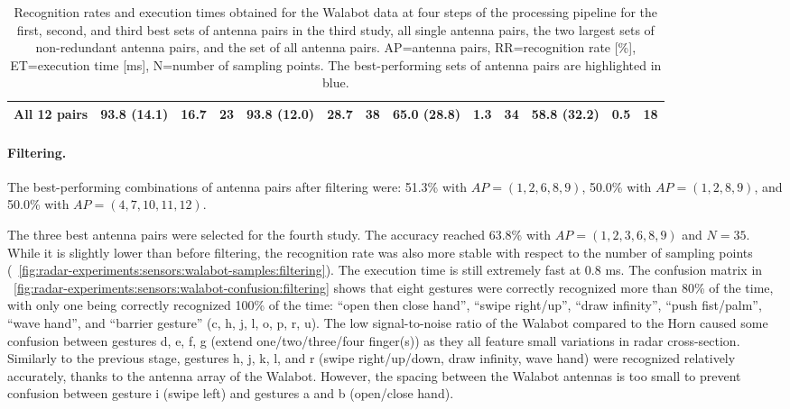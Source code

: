 \begin{table}[bt]
{\begin{tabular}{l|rrr|rrr|rrr|rrr}
        All 12 pairs & \cellcolor{highlightcolor} 93.8 (14.1) & 16.7 & 23 &
        93.8 (12.0) & 28.7 & 38 &
        \cellcolor{highlightcolor} 65.0 (28.8) & 1.3 & 34 &
        58.8 (32.2) & 0.5 & 18 \\
        \bottomrule
    \end{tabular}
    }
    \caption{Recognition rates and execution times obtained for the Walabot data at four steps of the processing pipeline for the first, second, and third best sets of antenna pairs in the third study, all single antenna pairs, the two largest sets of non-redundant antenna pairs, and the set of all antenna pairs. AP=antenna pairs, RR=recognition rate [\%], ET=execution time [ms], N=number of sampling points. The best-performing sets of antenna pairs are highlighted in blue.}
    \label{tab:radar-experiments:sensors:walabot}
\end{table}

\paragraph{Filtering.}
The best-performing combinations of antenna pairs after filtering were: 51.3\% with $AP{=}(1, 2, 6, 8, 9)$, 50.0\% with $AP{=}(1, 2, 8, 9)$, and 50.0\% with $AP{=}(4, 7, 10, 11, 12)$.

The three best antenna pairs were selected for the fourth study. 
The accuracy reached 63.8\% with $AP{=}(1, 2, 3, 6, 8, 9)$ and $N{=}35$. While it is slightly lower than before filtering, the recognition rate was also more stable with respect to the number of sampling points (\fig~\ref{fig:radar-experiments:sensors:walabot-samples:filtering}).
The execution time is still extremely fast at 0.8 ms. 
%
The confusion matrix in \fig~\ref{fig:radar-experiments:sensors:walabot-confusion:filtering} shows that eight gestures were correctly recognized more than 80\% of the time, with only one being correctly recognized 100\% of the time: ``open then close hand'', ``swipe right/up'', ``draw infinity'', ``push fist/palm'', ``wave hand'', and ``barrier gesture'' (c, h, j, l, o, p, r, u).
%
The low signal-to-noise ratio of the Walabot compared to the Horn caused some confusion between gestures d, e, f, g (extend one/two/three/four finger(s)) as they all feature small variations in radar cross-section.
%
Similarly to the previous stage, gestures h, j, k, l, and r (swipe right/up/down, draw infinity, wave hand) were recognized relatively accurately, thanks to the antenna array of the Walabot.
%
However, the spacing between the Walabot antennas is too small to prevent confusion between gesture i (swipe left) and gestures a and b (open/close hand).

